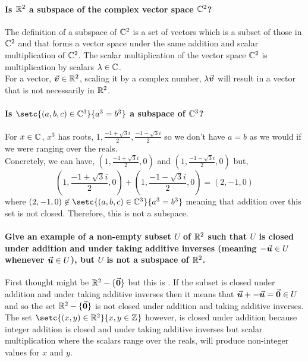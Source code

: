 \documentclass[MathsNotesBase.tex]{subfiles}
\begin{document}
	
	\paragraph{Is $\mathbb{R}^{2}$ a subspace of the complex vector space $\mathbb{C}^{2}$?}	
	The definition of a subspace of $\mathbb{C}^{2}$ is a set of vectors which is a subset of those in $\mathbb{C}^{2}$ and that forms a vector space under the same addition and scalar multiplication of $\mathbb{C}^{2}$. The scalar multiplication of the vector space $\mathbb{C}^{2}$ is multiplication by scalars $\lambda \in \mathbb{C}^{}$.\\
	For a vector, $\vec{\bm{v}} \in \mathbb{R}^{2}$, scaling it by a complex number, $\lambda\vec{\bm{v}}$ will result in a vector that is not necessarily in $\mathbb{R}^{2}$.
	
	
	\paragraph{Is $\setc{(a,b,c) \in \C{3}}{a^3 = b^3}$ a subspace of $\mathbb{C}^{3}$?}
	For $x \in \mathbb{C}^{}$, $x^3$ has roots, $1, \frac{-1 + \sqrt{3}i}{2}, \frac{-1 - \sqrt{3}i}{2}$ so we don't have $a = b$ as we would if we were ranging over the reals. \\
	Concretely, we can have, $(1,\frac{-1 + \sqrt{3}i}{2},0)$ and $(1,\frac{-1 - \sqrt{3}i}{2},0)$ but,
	\[ (1,\frac{-1 + \sqrt{3}i}{2},0) + (1,\frac{-1 - \sqrt{3}i}{2},0) = (2,-1,0) \]
	where $(2,-1,0) \not\in \setc{(a,b,c) \in \C{3}}{a^3 = b^3}$ meaning that addition over this set is not closed. Therefore, this is not a subspace.
	
	
	\paragraph{\small{Give an example of a non-empty subset $U$ of $\mathbb{R}^{2}$ such that $U$ is closed under addition and under taking additive inverses (meaning $-\vec{\bm{u}} \in U$ whenever $\vec{\bm{u}} \in U$), but $U$ is not a subspace of $\mathbb{R}^{2}$.}}
	First thought might be $\mathbb{R}^{2} - \{\vec{\bm{0}}\}$ but this is \wrong. If the subset is closed under addition and under taking additive inverses then it means that $\vec{\bm{u}} + -\vec{\bm{u}} = \vec{\bm{0}} \in U$ and so the set $\mathbb{R}^{2} - \{\vec{\bm{0}}\}$ is not closed under addition and taking additive inverses.\\
	The set $\setc{(x,y) \in \R{2}}{x,y \in \Z{}}$ however, is closed under addition because integer addition is closed and under taking additive inverses but scalar multiplication where the scalars range over the reals, will produce non-integer values for $x$ and $y$.

	
\end{document}
